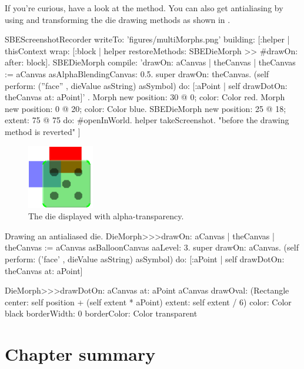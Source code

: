 \documentclass[a4paper,10pt,twoside]{book}
\begin{document}
If you're curious, have a look at the  method.
You can also get antialiasing by using  and transforming the die drawing methods as shown in .

\begin{ExecuteSmalltalkScript}
SBEScreenshotRecorder writeTo: 'figures/multiMorphs.png' building: [:helper |
	thisContext wrap: [:block | helper restoreMethods: {SBEDieMorph >> #drawOn:} after: block].
	SBEDieMorph compile: 'drawOn: aCanvas
	| theCanvas |
	theCanvas := aCanvas asAlphaBlendingCanvas: 0.5.
	super drawOn: theCanvas.
	(self perform: (''face'' , dieValue asString) asSymbol)
		do: [:aPoint | self drawDotOn: theCanvas at: aPoint]'
	.
	{ Morph new
		position: 30 @ 0;
		color: Color red.
	Morph new
		position: 0 @ 20;
		color: Color blue.
	SBEDieMorph new
		position: 25 @ 18;
		extent: 75 @ 75 } do: #openInWorld.
	helper takeScreenshot. "before the drawing method is reverted"
]
\end{ExecuteSmalltalkScript}
\begin{figure}[ht]
	\centerline{\includegraphics[scale=0.7]{multiMorphs}}
	\caption{The die displayed with alpha-transparency.
		\label{fig:multiMorphs}}
\end{figure}

\begin{methods}[aadie]{Drawing an antialiased die.}
DieMorph>>>drawOn: aCanvas
	| theCanvas |
	theCanvas := aCanvas asBalloonCanvas aaLevel: 3.
	super drawOn: aCanvas.
	(self perform: ('face' , dieValue asString) asSymbol)
		do: [:aPoint | self drawDotOn: theCanvas at: aPoint]

DieMorph>>>drawDotOn: aCanvas at: aPoint
	aCanvas
		drawOval: (Rectangle
			center: self position + (self extent * aPoint)
			extent: self extent / 6)
		color: Color black
		borderWidth: 0
		borderColor: Color transparent
\end{methods}

\section{Chapter summary}
\end{document}

